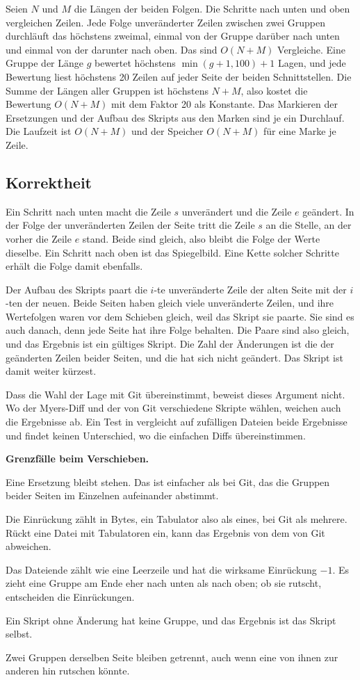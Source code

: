 Seien $N$ und $M$ die Längen der beiden Folgen. Die Schritte nach unten und oben vergleichen
Zeilen. Jede Folge unveränderter Zeilen zwischen zwei Gruppen durchläuft das höchstens zweimal,
einmal von der Gruppe darüber nach unten und einmal von der darunter nach oben. Das sind
$O(N+M)$ Vergleiche. Eine Gruppe der Länge $g$ bewertet höchstens $\min(g+1, 100) + 1$ Lagen, und
jede Bewertung liest höchstens 20 Zeilen auf jeder Seite der beiden Schnittstellen. Die Summe der
Längen aller Gruppen ist höchstens $N+M$, also kostet die Bewertung $O(N+M)$ mit dem Faktor 20
als Konstante. Das Markieren der Ersetzungen und der Aufbau des Skripts aus den Marken sind je
ein Durchlauf. Die Laufzeit ist $O(N+M)$ und der Speicher $O(N+M)$ für eine Marke je Zeile.

\subsection{Korrektheit}

Ein Schritt nach unten macht die Zeile $s$ unverändert und die Zeile $e$ geändert. In der Folge
der unveränderten Zeilen der Seite tritt die Zeile $s$ an die Stelle, an der vorher die Zeile $e$
stand. Beide sind gleich, also bleibt die Folge der Werte dieselbe. Ein Schritt nach oben ist das
Spiegelbild. Eine Kette solcher Schritte erhält die Folge damit ebenfalls.

Der Aufbau des Skripts paart die $i$-te unveränderte Zeile der alten Seite mit der $i$-ten der
neuen. Beide Seiten haben gleich viele unveränderte Zeilen, und ihre Wertefolgen waren vor dem
Schieben gleich, weil das Skript sie paarte. Sie sind es auch danach, denn jede Seite hat ihre
Folge behalten. Die Paare sind also gleich, und das Ergebnis ist ein gültiges Skript. Die Zahl
der Änderungen ist die der geänderten Zeilen beider Seiten, und die hat sich nicht geändert. Das
Skript ist damit weiter kürzest.

Dass die Wahl der Lage mit Git übereinstimmt, beweist dieses Argument nicht. Wo der Myers-Diff
und der von Git verschiedene Skripte wählen, weichen auch die Ergebnisse ab. Ein Test in
 vergleicht auf zufälligen Dateien beide Ergebnisse und findet
keinen Unterschied, wo die einfachen Diffs übereinstimmen.

\startinfobox
{\bf Grenzfälle beim Verschieben.}
\startitemize
\item Eine Ersetzung bleibt stehen. Das ist einfacher als bei Git, das die Gruppen beider Seiten
im Einzelnen aufeinander abstimmt.
\item Die Einrückung zählt in Bytes, ein Tabulator also als eines, bei Git als mehrere.
Rückt eine Datei mit Tabulatoren ein, kann das Ergebnis von dem von Git abweichen.
\item Das Dateiende zählt wie eine Leerzeile und hat die wirksame Einrückung $-1$. Es zieht eine
Gruppe am Ende eher nach unten als nach oben; ob sie rutscht, entscheiden die Einrückungen.
\item Ein Skript ohne Änderung hat keine Gruppe, und das Ergebnis ist das Skript selbst.
\item Zwei Gruppen derselben Seite bleiben getrennt, auch wenn eine von ihnen zur anderen hin
rutschen könnte.
\stopitemize
\stopinfobox

